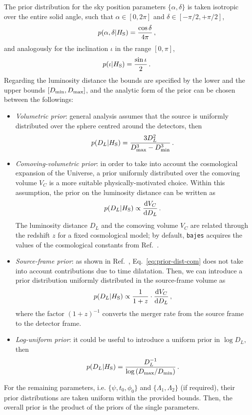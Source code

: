\documentclass[prd,aps,twocolumn,a4paper,showkeys,nofootinbib,floatfix]{revtex4-1}
\newcommand{\be}{\begin{equation}}
\newcommand{\ee}{\end{equation}}
\def\d{\text{d}}
\newcommand{\bajes}{{\tt bajes}}
\begin{document}
 The prior distribution for the sky position parameters $\{\alpha,\delta\}$
 is taken isotropic over the entire solid angle,
 such that $\alpha \in [0, 2\pi]$ and $\delta \in [-\pi/2,+\pi/2]$,
  						\be
 \label{eq:prior-skypos}
 p(\alpha,\delta|H_{\rm S}) = \frac{\cos\delta}{4\pi}\,,
 \ee
 and analogously for the inclination $\iota$ in the range $[0,\pi]$,
  	\be
 \label{eq:prior-iota}
 p(\iota|H_{\rm S}) =\frac{\sin\iota}{2}\,.
 \ee
 Regarding the luminosity distance the bounds are specified by the lower and the upper bounds 
 $[D_{\rm min}, D_{\rm max}]$, and the analytic form of the prior can be chosen between the followings:
  \begin{itemize}
 	\item {\it Volumetric prior}: 
 	general analysis assumes that the source is uniformly distributed over the 
 	sphere centred around the detectors, then 
 	\be
 	\label{eq:prior-dist-vol}
 	p(D_L|H_{\rm S}) = \frac{3 D_L^2}{D_{\rm max}^3-D_{\rm min}^3}\,.
 	\ee
 	\item {\it Comoving-volumetric prior}: 
 	in order to take into account the cosmological expansion of the Universe,
 	a prior uniformly distributed over the comoving volume $V_C$ is a more suitable
 	physically-motivated choice.
 	Within this assumption, the prior on the luminosity distance can be written as  
 	\be
 	\label{eq:prior-dist-com}
 	p(D_L|H_{\rm S}) \propto \frac{\d V_C}{\d D_L}\,.
 	\ee
 	The luminosity distance $D_L$ and the comoving volume $V_C$
 	 are related through the redshift $z$ for a fixed cosmological model;
 	by default, {\bajes} acquires the values of the cosmological constants 
 	from Ref.~\cite{Aghanim:2018eyx}.
	\item {\it Source-frame prior}:
	as shown in Ref.~\cite{Abbott:2019yzh,Abbott:2020niy},
	Eq.~\eqref{eq:prior-dist-com} does not take into account 
	contributions due to time dilatation. Then, we can introduce 
	a prior distribution uniformly distributed in the source-frame volume as
	\be
	\label{eq:prior-dist-source}
	p(D_L|H_{\rm S}) \propto \frac{1}{1+z}\cdot \frac{\d V_C}{\d D_L}\,,
	\ee
	where the factor $(1 + z)^{-1}$ converts the merger rate from the
	source frame to the detector frame.
 	\item {\it Log-uniform prior}:
 	it could be useful to introduce a uniform prior in $\log D_L$, then
 	\be
 	\label{eq:prior-dist-log}
 	p(D_L |H_{\rm S}) = \frac{D_L^{-1}}{\log\left(D_{\rm max}/D_{\rm min}\right)}\,.
 	\ee
 \end{itemize} 

For the remaining parameters, i.e. $\{\psi,t_0,\phi_0\}$ and $\{\Lambda_1,\Lambda_2\}$ (if required),
their prior distributions are taken uniform within the provided bounds.
Then, the overall prior is the product of the priors of the single parameters.
\end{document}
